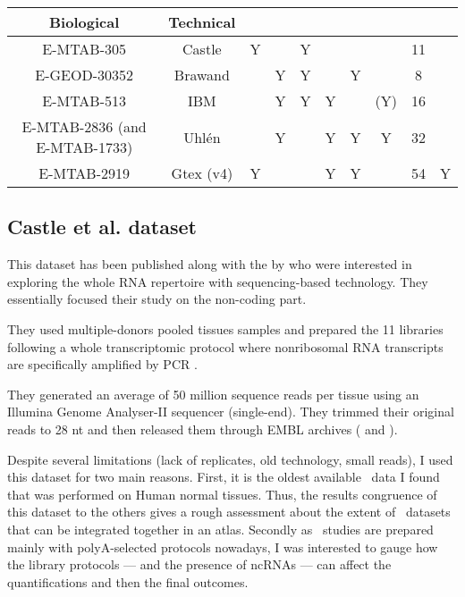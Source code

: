 \begin{sidewaystable}
\begin{tabular}{@{}cccccccccc@{}}
            \multicolumn{1}{c|}{Biological} & \multicolumn{1}{c|}{Technical} &
            \multicolumn{1}{c|}{} &  \\
       \midrule
       E-MTAB-305 & Castle & Y &  & Y &  &  &  & 11 &  \\
       E-GEOD-30352 & Brawand &  & Y & Y &  & Y &  & 8 &  \\
       E-MTAB-513 & IBM &  & Y & Y & Y &  & (Y) & 16 &  \\
       E-MTAB-2836 \footnotesize{(and E-MTAB-1733)}& Uhlén &  & Y &  & Y & Y & Y & 32 &  \\
       E-MTAB-2919 & Gtex (v4)  & Y &  &  & Y & Y &  & 54 & Y \\
       \bottomrule
       \end{tabular}
\end{sidewaystable}

\subsection{Castle et al. dataset}

This dataset has been published along with the 
by \citet{castleData} who were interested in exploring the whole RNA repertoire
with sequencing-based technology. They essentially focused their study
on the non-coding part.
\begin{comment}
and found that
while \glspl{mRNA} could be highly tissue-specific, \glspl{ncRNA} have generally
greater tissue-specific expression patterns.
\end{comment}

They used multiple-donors pooled tissues samples %
and prepared the 11 libraries following a whole transcriptomic protocol
where nonribosomal \gls{RNA} transcripts are
specifically amplified by \gls{PCR} \citep{Armour:2009}.

They generated an average of 50 million sequence reads per tissue
using an Illumina Genome Analyser-II sequencer (single-end).
They trimmed their original reads to 28 \gls{nt}
and then released them through EMBL archives (
and ).

Despite several limitations (lack of replicates, old technology, small reads),
I used this dataset for two main reasons. First, it is the oldest available
\Rnaseq\ data I found that was performed on Human normal tissues. Thus, the
results congruence of this dataset to the others gives a rough assessment about
the extent of \Rnaseq\ datasets that can be integrated together in an atlas.
Secondly as \Rnaseq\ studies are prepared mainly with polyA-selected protocols
nowadays, I was interested to gauge how the library protocols --- and the
presence of \glspl{ncRNA} --- can affect the quantifications and then the final
outcomes.


